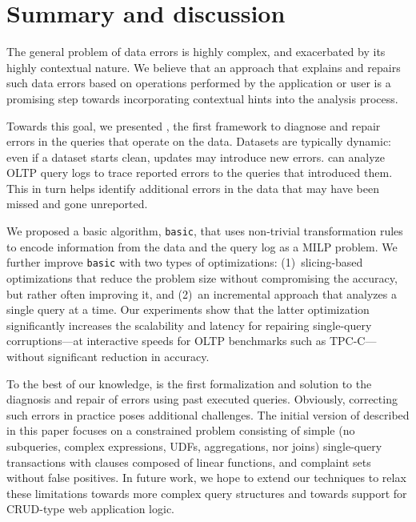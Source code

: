 

\section{Summary and discussion}

The general problem of data errors is highly complex, and exacerbated by its highly contextual nature.
We believe that an approach that explains and repairs such data errors based on operations performed by the application or user is a promising step towards incorporating contextual hints into the analysis process.

Towards this goal, we presented \sys, the first framework to diagnose and
repair errors in the queries that operate on the data.
Datasets are typically dynamic: even if a dataset starts clean,
updates may introduce new errors. \sys can
analyze OLTP query logs to trace reported errors to the queries that
introduced them. This in turn helps identify additional errors
in the data that may have been missed and gone unreported.

We proposed a basic algorithm, \texttt{basic}, that uses non-trivial transformation rules to
encode information from the data and the query log as a MILP problem. We further improve 
\texttt{basic} with two types of optimizations: 
(1)~slicing-based optimizations that reduce the problem
size without compromising the accuracy, but rather often improving it, and 
(2)~an incremental approach that analyzes a single query at a time. 
Our experiments show that the latter
optimization significantly increases the scalability and latency for repairing single-query corruptions---at interactive speeds for OLTP benchmarks such as TPC-C---without significant reduction in accuracy.

To the best of our knowledge, \sys is the first formalization and solution to the diagnosis
and repair of errors using past executed queries. 
Obviously, correcting such errors in practice poses additional challenges. 
The initial version of \sys described in this paper focuses on a constrained problem consisting of
simple (no subqueries, complex expressions, UDFs, aggregations, nor joins)
single-query transactions with clauses composed of linear functions, and
complaint sets without false positives.
In future work, we hope to extend our techniques to relax these limitations towards more complex query structures and towards support for CRUD-type web application logic.



